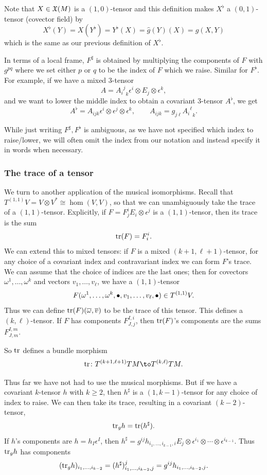 Note that $X\in{\frak X}(M)$ is a $(1,0)$-tensor and this definition makes $X^\flat$ a $(0,1)$-tensor (covector field) by
$$ X^\flat(Y) = X(Y^\flat) = Y^\flat(X) = \hat g(Y)(X) = g(X,Y) $$
which is the same as our previous definition of $X^\flat$.

In terms of a local frame, $F^\sharp$ is obtained by multiplying the components of $F$ with $g^{pq}$ where we set either $p$ or $q$ to be the index
of $F$ which we raise.
Similar for $F^\flat$.
For example, if we have a mixed $3$-tensor
$$ A = {{A_i}^j}_k\epsilon^i\otimes E_j\otimes\epsilon^k , $$
and we want to lower the middle index to obtain a covariant $3$-tensor $A^\flat$, we get
$$ A^\flat = A_{ijk}\epsilon^i\otimes\epsilon^j\otimes\epsilon^k,\qquad A_{ijk} = g_{j\ell}{{A_i}^\ell}_k . $$

While just writing $F^\sharp,F^\flat$ is ambiguous, as we have not specified which index to raise/lower, we will often omit the index from our notation and instead
specify it in words when necessary.

\subsubsection*{The trace of a tensor}

We turn to another application of the musical isomorphisms.
Recall that $T^{(1,1)}V=V\otimes V^*\cong\hom(V,V)$, so that we can unambiguously take the trace of a $(1,1)$-tensor.
Explicitly, if $F=F^i_jE_i\otimes\epsilon^j$ is a $(1,1)$-tensor, then its trace is the sum
$$ {\rm tr}(F) = F^i_i . $$
We can extend this to mixed tensors: if $F$ is a mixed $(k+1,\ell+1)$-tensor, for any choice of a covariant index and contravariant index we can form $F$'s trace.
We can assume that the choice of indices are the last ones; then for covectors $\omega^1,\dots,\omega^k$ and vectors $v_1,\dots,v_\ell$, we have a $(1,1)$-tensor
$$ F(\omega^1,\dots,\omega^k,\bullet,v_1,\dots,v_\ell,\bullet) \in T^{(1,1)}V . $$
Thus we can define ${\rm tr}(F)(\overline\omega,\overline v)$ to be the trace of this tensor.
This defines a $(k,\ell)$-tensor.
If $F$ has components $F^{I,i}_{J,j}$, then ${\rm tr}(F)$'s components are the sums $F^{I,m}_{J,m}$.

So ${\rm tr}$ defines a bundle morphism
$$ \tr\colon T^{(k+1,\ell+1)}TM \to T^{(k,\ell)}TM . $$

Thus far we have not had to use the musical morphisms.
But if we have a covariant $k$-tensor $h$ with $k\geq2$, then $h^\sharp$ is a $(1,k-1)$-tensor for any choice of index to raise.
We can then take its trace, resulting in a covariant $(k-2)$-tensor,
$$ {\rm tr}_gh = {\rm tr}(h^\sharp) . $$
If $h$'s components are $h=h_I\epsilon^I$, then $h^\sharp=g^{ij}h_{i_1,\dots,i_{k-1},i}E_j\otimes\epsilon^{i_1}\otimes\cdots\otimes\epsilon^{i_{k-1}}$.
Thus ${\rm tr}_gh$ has components
$$ ({\rm tr}_gh)_{i_1,\dots,i_{k-2}} = (h^\sharp)_{i_1,\dots,i_{k-2},j}^j = g^{ij}h_{i_1,\dots,i_{k-2},j} . $$

